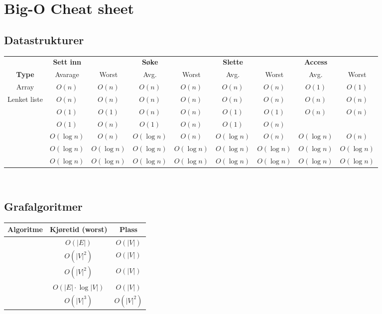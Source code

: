 \section{Big-O Cheat sheet}
\subsection*{Datastrukturer}

\begin{table}[H]
\footnotesize
\centering
\begin{tabular}{c || c  c | c c | c c | c c} 
	                   & \textbf{Sett inn} &               & \textbf{Søke} & & \textbf{Slette} & & \textbf{Access} & \\
	 \textbf{Type}     & {Avarage}         & {Worst}       &Avg.&Worst&Avg.&Worst&Avg.&Worst\\ \hline
	 Array & $ O(n) $ & $ O(n) $ & $ O(n) $ & $ O(n) $ & $ O(n) $ & $ O(n) $ & $ O(1) $ & $ O(1) $ \\
	 Lenket liste & $ O(n) $ & $ O(n) $ & $ O(n) $ & $ O(n) $ & $ O(n) $ & $ O(n) $ & $ O(n) $ & $ O(n) $ \\
	 \nameref{ko_stack} & $ O(1) $ & $ O(1) $ & $ O(n) $ & $ O(n) $ & $ O(1) $ & $ O(1) $ & $ O(n) $ & $ O(n) $ \\
	 \nameref{hashmap} & $ O(1) $ & $ O(n) $ & $ O(1) $ & $ O(n) $ & $ O(1) $ & $ O(n) $ & & \\
	\nameref{bintraer} & $ O(\log n) $     & $ O(n) $   & $ O(\log n) $     & $ O(n) $  & $ O(\log n) $     & $ O(n) $  & $ O(\log n) $     & $ O(n) $ \\
	 \nameref{rb_tre}  & $ O(\log n) $     & $ O(\log n) $ & $ O(\log n) $     & $ O(\log n) $& $ O(\log n) $     & $ O(\log n) $& $ O(\log n) $     & $ O(\log n) $\\
	 \nameref{b-tre}   & $ O(\log n) $     & $ O(\log n) $ & $ O(\log n) $     & $ O(\log n) $& $ O(\log n) $     & $ O(\log n) $& $ O(\log n) $     & $ O(\log n) $
\end{tabular}
\end{table}


~\\\subsection*{Grafalgoritmer}
\begin{center}
\begin{tabular}{c || c | c}
	\textbf{Algoritme} & \textbf{Kjøretid (worst)}   & \textbf{Plass} \\ \hline
	  \nameref{dfs}    & $ O(|E|) $                  & $ O(|V|) $     \\
	\nameref{dijkstra} & $ O(|V|^2) $                & $ O(|V|) $     \\
	  \nameref{prim}   & $ O(|V|^2) $                & $ O(|V|) $     \\
	\nameref{kruskal}  & $ O(|E| \cdot \log |V|) $ & $ O(|V|) $     \\
	 \nameref{floyd}   & $ O(|V|^3) $                & $ O(|V|^2) $
\end{tabular}
\end{center}


